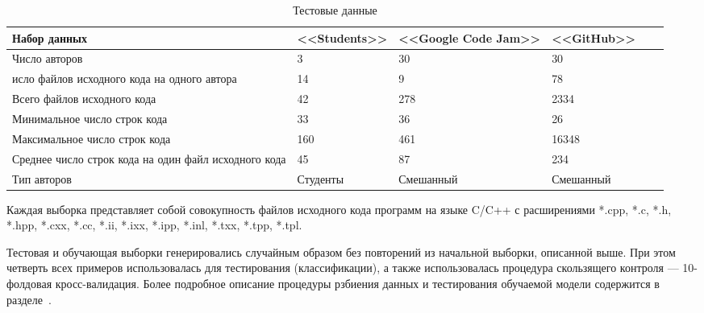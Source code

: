 \begin{table}[h!]
\caption{ Тестовые данные }
\label{tab:data}
\begin{center}
\begin{tabularx}{\linewidth}{|X|X|X|X|X|X|}
\hline
Набор данных & <<Students>> & <<Google Code Jam>> & <<GitHub>> \\
\hline
Число авторов & 3 & 30 & 30 \\
\hline
исло файлов исходного кода на одного автора & 14 & 9 & 78 \\
\hline
Всего файлов исходного кода & 42 & 278 & 2334 \\
\hline
Минимальное число строк кода & 33 & 36 & 26 \\
\hline
Максимальное число строк кода & 160 & 461 & 16348 \\
\hline
Среднее число строк кода на один файл исходного кода & 45 & 87 & 234 \\
\hline
Тип авторов & Студенты & Смешанный & Смешанный \\
\hline
\end{tabularx}
\end{center}
\end{table}


Каждая выборка представляет собой совокупность файлов исходного кода программ на языке C/C++ с расширениями
*.cpp, *.c, *.h, *.hpp, *.cxx, *.cc, *.ii, *.ixx, *.ipp, *.inl, *.txx, *.tpp, *.tpl.

Тестовая и обучающая выборки генерировались случайным образом без повторений из начальной выборки, 
описанной выше. При этом четверть всех примеров использовалась для тестирования (классификации), а также
использовалась процедура скользящего контроля --- 10-фолдовая кросс-валидация. Более подробное 
описание процедуры рзбиения данных и тестирования обучаемой модели содержится в разделе~\label{classifiers}.



